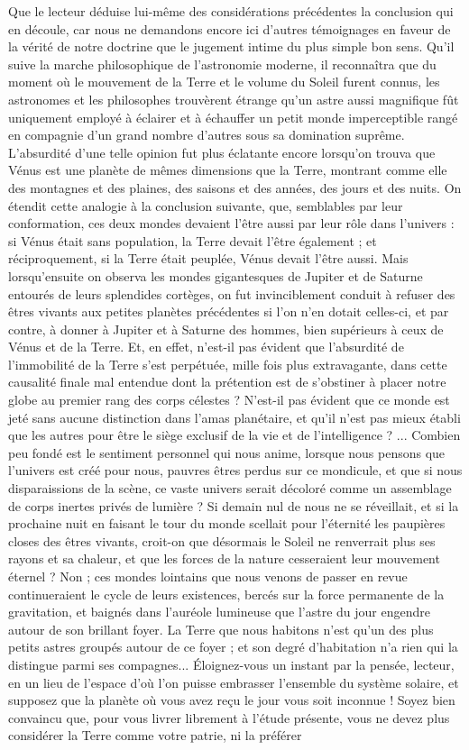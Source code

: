 \documentclass[a4paper, 11pt, oneside, landscape]{article}
\begin{document}
Que le lecteur déduise lui-même des considérations précédentes la conclusion qui en découle, car nous ne demandons encore ici d'autres témoignages en faveur de la vérité de notre doctrine que le jugement intime du plus simple bon sens. Qu'il suive la marche philosophique de l'astronomie moderne, il reconnaîtra que du moment où le mouvement de la Terre et le volume du Soleil furent connus, les astronomes et les philosophes trouvèrent étrange qu'un astre aussi magnifique fût uniquement employé à éclairer et à échauffer un petit monde imperceptible rangé en compagnie d'un grand nombre d'autres sous sa domination suprême. L'absurdité d'une telle opinion fut plus éclatante encore lorsqu'on trouva que Vénus est une planète de mêmes dimensions que la Terre, montrant comme elle des montagnes et des plaines, des saisons et des années, des jours et des nuits. On étendit cette analogie à la conclusion suivante, que, semblables par leur conformation, ces deux mondes devaient l'être aussi par leur rôle dans l'univers : si Vénus était sans population, la Terre devait l'être également ; et réciproquement, si la Terre était peuplée, Vénus devait l'être aussi. Mais lorsqu'ensuite on observa les mondes gigantesques de Jupiter et de Saturne entourés de leurs splendides cortèges, on fut invinciblement conduit à refuser des êtres vivants aux petites planètes précédentes si l'on n'en dotait celles-ci, et par contre, à donner à Jupiter et à Saturne des hommes, bien supérieurs à ceux de Vénus et de la Terre. Et, en effet, n'est-il pas évident que l'absurdité de l'immobilité de la Terre s'est perpétuée, mille fois plus extravagante, dans cette causalité finale mal entendue dont la prétention est de s'obstiner à placer notre globe au premier rang des corps célestes ? N'est-il pas évident que ce monde est jeté sans aucune distinction dans l'amas planétaire, et qu'il n'est pas mieux établi que les autres pour être le siège exclusif de la vie et de l'intelligence ? ... Combien peu fondé est le sentiment personnel qui nous anime, lorsque nous pensons que l'univers est créé pour nous, pauvres êtres perdus sur ce mondicule, et que si nous disparaissions de la scène, ce vaste univers serait décoloré comme un assemblage de corps inertes privés de lumière ? Si demain nul de nous ne se réveillait, et si la prochaine nuit en faisant le tour du monde scellait pour l'éternité les paupières closes des êtres vivants, croit-on que désormais le Soleil ne renverrait plus ses rayons et sa chaleur, et que les forces de la nature cesseraient leur mouvement éternel ? Non ; ces mondes lointains que nous venons de passer en revue continueraient le cycle de leurs existences, bercés sur la force permanente de la gravitation, et baignés dans l'auréole lumineuse que l'astre du jour engendre autour de son brillant foyer. La Terre que nous habitons n'est qu'un des plus petits astres groupés autour de ce foyer ; et son degré d'habitation n'a rien qui la distingue parmi ses compagnes... Éloignez-vous un instant par la pensée, lecteur, en un lieu de l'espace d'où l'on puisse embrasser l'ensemble du système solaire, et supposez que la planète où vous avez reçu le jour vous soit inconnue ! Soyez bien convaincu que, pour vous livrer librement à l'étude présente, vous ne devez plus considérer la Terre comme votre patrie, ni la préférer 
\end{document}
